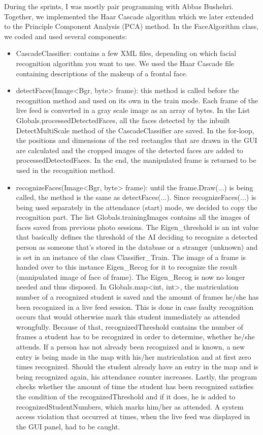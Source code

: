 \documentclass[12pt, a4paper]{article}
\begin{document}
During the sprints, I was mostly pair programming with Abbas Bushehri. Together, we implemented the Haar Cascade algorithm which we later extended to the Principle Component Analysis (PCA) method. In the FaceAlgorithm class, we coded and used several components:
\begin{itemize}
\item CascadeClassifier: contains a few XML files, depending on which facial recognition algorithm you want to use. We used the Haar Cascade file containing descriptions of the makeup of a frontal face.
\item detectFaces(Image<Bgr, byte> frame): this method is called before the recognition method and used on its own in the train mode. Each frame of the live feed is converted in a gray scale image as an array of bytes. In the List Globals.processedDetectedFaces, all the faces detected by the inbuilt DetectMultiScale method of the CascadeClassifier are saved. In the for-loop, the positions and dimensions of the red rectangles that are drawn in the GUI are calculated and the cropped images of the detected faces are added to processedDetectedFaces. In the end, the manipulated frame is returned to be used in the recognition method.
\item recognizeFaces(Image<Bgr, byte> frame): until the frame.Draw(...) is being called, the method is the same as detectFaces(...). Since recognizeFaces(...) is being used separately in the attendance (start) mode, we decided to copy the recognition part. The list Globals.trainingImages contains all the images of faces saved from previous photo sessions. The Eigen\_threshold is an int value that basically defines the threshold of the AI deciding to recognize a detected person as someone that's stored in the database or a stranger (unknown) and is set in an instance of the class Classifier\_Train. The image of a frame is handed over to this instance Eigen\_Recog for it to recognize the result (manipulated image of face of frame). The Eigen\_Recog is now no longer needed and thus disposed. In Globals.map<int, int>, the matriculation number of a recognized student is saved and the amount of frames he/she has been recognized in a live feed session. This is done in case faulty recognition occurs that would otherwise mark this student immediately as attended wrongfully. Because of that, recognizedThreshold contains the number of frames a student has to be recognized in order to determine, whether he/she attends. If a person has not already been recognized and is known, a new entry is being made in the map with his/her matriculation and at first zero times recognized. Should the student already have an entry in the map and is being recognized again, his attendance counter increases. Lastly, the program checks whether the amount of time the student has been recognized satisfies the condition of the recognizedThreshold and if it does, he is added to recognizedStudentNumbers, which marks him/her as attended. A system access violation that occurred at times, when the live feed was displayed in the GUI panel, had to be caught.
\end{itemize}
\end{document}
